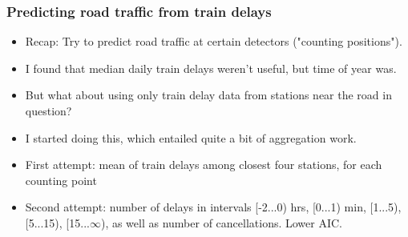 \documentclass{beamer}
\begin{document}


\begin{frame}\frametitle{Predicting road traffic from train delays}
\begin{itemize}
\item Recap: Try to predict road traffic at certain detectors ("counting positions").
\item I found that median daily train delays weren't useful, but time of year was.
\item But what about using only train delay data from stations near the road in question?
\item I started doing this, which entailed quite a bit of aggregation work.
\item First attempt: mean of train delays among closest four stations, for each counting point
\item Second attempt: number of delays in intervals [-2...0) hrs, [0...1) min, [1...5), [5...15), [15...$\infty$), as well as number of cancellations. Lower AIC.
\end{itemize}
\end{frame}
\end{document}
